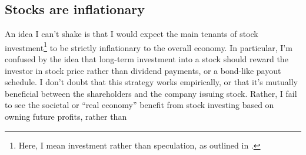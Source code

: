 \subsection{Stocks are inflationary}

An idea I can't shake is that I would expect the main tenants of stock investment\footnote{Here, I mean investment rather than speculation, as outlined in \cite{Graham2024}.} to be strictly inflationary to the overall economy.  In particular, I'm confused by the idea that long-term investment into a stock should reward the investor in stock price rather than dividend payments, or a bond-like payout schedule.  I don't doubt that this strategy works empirically, or that it's mutually beneficial between the shareholders and the company issuing stock.  Rather, I fail to see the societal or ``real economy'' benefit from stock investing based on owning future profits, rather than 